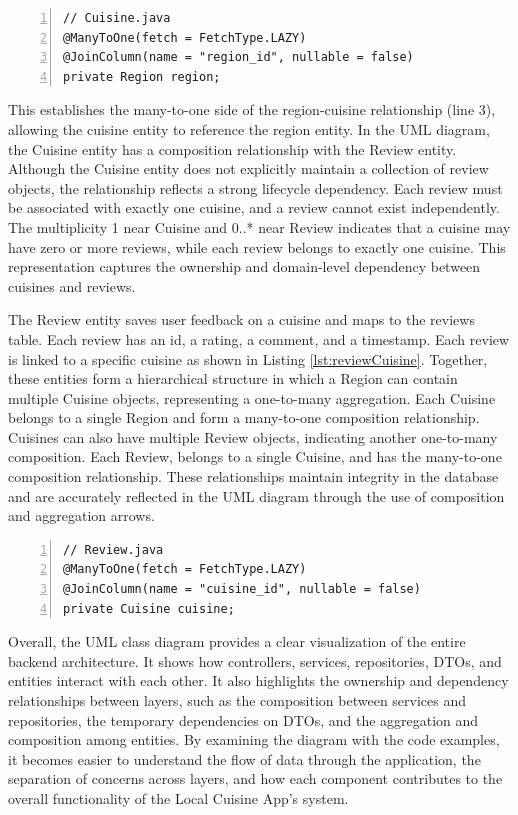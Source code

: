 \begin{lstlisting}[caption={Cuisine -- Many-to-One relationship with Region}, label={lst:cuisineRegion}, numbers=left, firstnumber=1]
// Cuisine.java
@ManyToOne(fetch = FetchType.LAZY)
@JoinColumn(name = "region_id", nullable = false)
private Region region;
\end{lstlisting}

This establishes the many-to-one side of the region-cuisine relationship (line 3), allowing the cuisine entity to reference the region entity.
In the UML diagram, the Cuisine entity has a composition relationship with the Review entity.
Although the Cuisine entity does not explicitly maintain a collection of review objects, the relationship reflects a strong lifecycle dependency.
Each review must be associated with exactly one cuisine, and a review cannot exist independently.
The multiplicity 1 near Cuisine and 0..* near Review indicates that a cuisine may have zero or more reviews, while each review belongs to exactly one cuisine.
This representation captures the ownership and domain-level dependency between cuisines and reviews.

The Review entity saves user feedback on a cuisine and maps to the reviews table.
Each review has an id, a rating, a comment, and a timestamp. Each review is linked to a specific cuisine as shown in Listing \ref{lst:reviewCuisine}.
Together, these entities form a hierarchical structure in which a Region can contain multiple Cuisine objects,
representing a one-to-many aggregation. Each Cuisine belongs to a single Region and
form a many-to-one composition relationship. Cuisines can also have multiple Review objects, indicating another one-to-many composition.
Each Review, belongs to a single Cuisine, and has the many-to-one composition relationship.
These relationships maintain integrity in the database and are accurately reflected in the UML diagram through the use of composition and aggregation arrows.

\begin{lstlisting}[caption={Review -- Many-to-One relationship with Cuisine}, label={lst:reviewCuisine}, numbers=left, firstnumber=1]
// Review.java
@ManyToOne(fetch = FetchType.LAZY)
@JoinColumn(name = "cuisine_id", nullable = false)
private Cuisine cuisine;
\end{lstlisting}



Overall, the UML class diagram provides a clear visualization of the entire backend architecture.
It shows how controllers, services, repositories, DTOs, and entities interact with each other.
It also highlights the ownership and dependency relationships between layers,
such as the composition between services and repositories, the temporary dependencies on DTOs, and the aggregation and composition among entities. 
By examining the diagram with the code examples, it becomes easier to understand the flow of data through the application,
the separation of concerns across layers, and how each component contributes to the overall functionality of the Local Cuisine App's system.  \\

